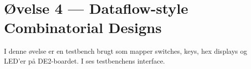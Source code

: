 \section{Øvelse 4 --- Dataflow-style Combinatorial Designs}

I denne øvelse er en testbench brugt som mapper switches, keys, hex displays og LED'er på DE2-boardet. I  ses testbenchens interface.





%